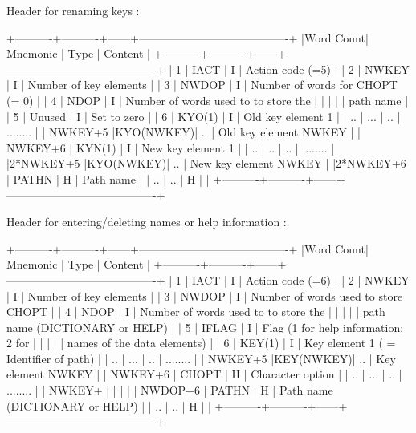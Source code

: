\begin{XMP}
   Header for renaming keys :

 +----------+----------+------+----------------------------------------+
 |Word Count| Mnemonic | Type |         Content                        |
 +----------+----------+------+----------------------------------------+
 |        1 |   IACT   |   I  | Action code (=5)                       |
 |        2 |  NWKEY   |   I  | Number of key elements                 |
 |        3 |  NWDOP   |   I  | Number of words for CHOPT (= 0)        |
 |        4 |   NDOP   |   I  | Number of words used to to store the   |
 |          |          |      | path name                              |
 |        5 |  Unused  |   I  | Set to zero                            |
 |        6 |  KYO(1)  |   I  | Old key element 1                      |
 |       .. |   ...    |  ..  |   ........                             |
 |  NWKEY+5 |KYO(NWKEY)|  ..  | Old key element NWKEY                  |
 |  NWKEY+6 |  KYN(1)  |   I  | New key element 1                      |
 |       .. |     ..   |  ..  |   ........                             |
 |2*NWKEY+5 |KYO(NWKEY)|  ..  | New key element NWKEY                  |
 |2*NWKEY+6 |  PATHN   |   H  | Path name                              |
 |       .. |     ..   |   H  |                                        |
 +----------+----------+------+----------------------------------------+

   Header for entering/deleting names or help information :

 +----------+----------+------+----------------------------------------+
 |Word Count| Mnemonic | Type |         Content                        |
 +----------+----------+------+----------------------------------------+
 |        1 |   IACT   |   I  | Action code (=6)                       |
 |        2 |  NWKEY   |   I  | Number of key elements                 |
 |        3 |  NWDOP   |   I  | Number of words used to store CHOPT    |
 |        4 |   NDOP   |   I  | Number of words used to to store the   |
 |          |          |      | path name (DICTIONARY or HELP)         |
 |        5 |  IFLAG   |   I  | Flag (1 for help information; 2 for    |
 |          |          |      | names of the data elements)            |
 |        6 |  KEY(1)  |   I  | Key element 1 ( = Identifier of path)  |
 |       .. |   ...    |  ..  |   ........                             |
 |  NWKEY+5 |KEY(NWKEY)|  ..  | Key element NWKEY                      |
 |  NWKEY+6 |  CHOPT   |   H  | Character option                       |
 |       .. |   ...    |  ..  |   ........                             |
 |   NWKEY+ |          |      |                                        |
 |  NWDOP+6 |  PATHN   |   H  | Path name (DICTIONARY or HELP)         |
 |       .. |     ..   |   H  |                                        |
 +----------+----------+------+----------------------------------------+


\end{XMP}
